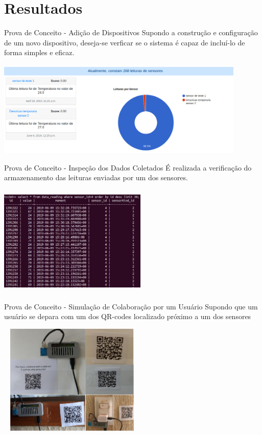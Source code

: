 \documentclass{beamer}
\begin{document}
  \section{Resultados}

    \begin{frame}{ Prova de Conceito - Adição de Dispositivos}
      \quad Supondo a construção e configuração de um novo dispositivo, deseja-se verficar se o sistema é capaz de incluí-lo de forma simples e eficaz.
      \begin{center}
      \includegraphics[height=130pt, width=\textwidth]{prova2}
      \end{center}
    \end{frame}
    \begin{frame}{Prova de Conceito - Inspeção dos Dados Coletados}
      \quad É realizada a verificação do armazenamento das leituras enviadas por um dos sensores.
      \begin{center}
      \includegraphics[height=150pt, width=200pt]{prova4}
      \end{center}
    \end{frame}
    \begin{frame}{Prova de Conceito - Simulação de Colaboração por um Usuário}
      \quad Supondo que um usuário se depara com um dos QR-codes localizado próximo a um dos sensores
      \begin{center}
      \includegraphics[height=150pt, width=200pt]{prova5}
      \end{center}
    \end{frame}
\end{document}

